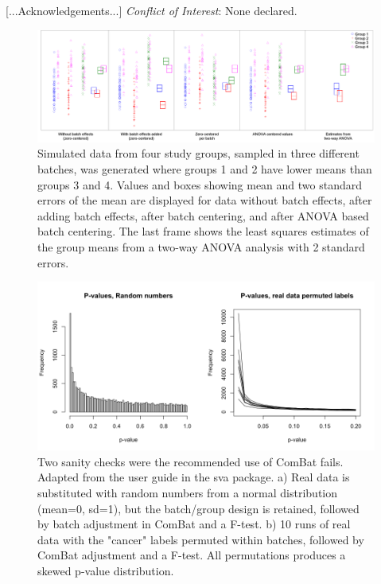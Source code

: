\documentclass{bio}
\begin{document}
[...Acknowledgements...]
{\it Conflict of Interest}: None declared.




%



\begin{figure}[!p]
\centering\includegraphics[width=13cm]{Fig/boxplots.png}
\caption{Simulated data from four study groups, sampled in three different batches, was generated where groups 1 and 2 have lower means than groups 3 and 4. Values and boxes showing mean and two standard errors of the mean are displayed for data without batch effects, after adding batch effects, after batch centering, and after ANOVA based batch centering. The last frame shows the least squares estimates of the group means from a two-way ANOVA analysis with 2 standard errors.}
\label{fig:boxplots}
\end{figure}


\begin{figure}[!p]
\centering\includegraphics[width=13cm]{Fig/pvaluesleeksva.png}
\caption{
Two sanity checks were the recommended use of ComBat fails. Adapted from the user guide in the sva package. 
a) Real data is substituted with random numbers from a normal distribution (mean=0, sd=1), but the batch/group design is retained, followed by batch adjustment in ComBat and a F-test.
b) 10 runs of real data with the "cancer" labels permuted within batches, followed by ComBat adjustment and a F-test. All permutations produces a skewed p-value distribution.
}
\label{fig:p-sva}
\end{figure}
\end{document}
